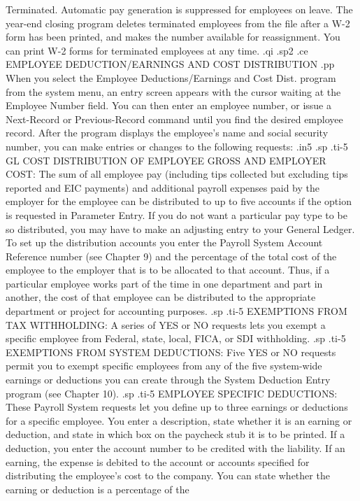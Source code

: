 Terminated. Automatic pay generation is suppressed for employees on
leave.
The year-end closing program deletes
terminated employees from the file after a W-2 form has been printed, and
makes the number available for reassignment. You can print W-2 forms for
terminated employees at any time.
.qi
.sp2
.ce
EMPLOYEE DEDUCTION/EARNINGS AND COST DISTRIBUTION
.pp
When you select the Employee Deductions/Earnings and Cost Dist.
program from the system
menu, an entry screen appears with the cursor
waiting at the Employee Number field.  You can then enter an employee
number, or issue a Next-Record or Previous-Record command until
you find the desired employee record.  After the program displays the
employee's name and social
security number, you can make entries or changes to the
following requests:
.in5
.sp
.ti-5
GL COST DISTRIBUTION OF EMPLOYEE GROSS AND EMPLOYER COST: The sum of
all employee pay (including tips collected but excluding tips reported
and EIC payments)
and additional payroll expenses paid by the employer for
the employee can be distributed to up to five accounts if
the option is requested in Parameter Entry.  If you do not want a
particular pay type to be so distributed, you may have to make an
adjusting entry to your General Ledger. To set up the distribution accounts
you enter the Payroll System Account Reference
number (see Chapter 9) and the
percentage of the total cost of the employee to the employer that is
to be allocated to that account.  Thus, if a particular employee works
part of the time in one department and part in another, the cost
of that employee can be distributed to the appropriate department
or project for accounting purposes.
.sp
.ti-5
EXEMPTIONS FROM TAX WITHHOLDING:  A series of YES or NO requests
lets you exempt a specific employee from Federal, state,
local, FICA, or SDI withholding.
.sp
.ti-5
EXEMPTIONS FROM SYSTEM DEDUCTIONS:  Five YES or NO requests
permit you to exempt specific employees from any of the
five system-wide earnings or
deductions you can create through the
System Deduction Entry program (see Chapter 10).
.sp
.ti-5
EMPLOYEE SPECIFIC DEDUCTIONS:  These Payroll System requests let
you define up to three earnings or deductions for
a specific employee.  You enter a description, state whether it is
an earning or deduction, and state in which box on the paycheck stub it
is to be printed.  If a deduction, you enter the account number to be
credited with the liability. If an earning, the expense is debited
to the account or accounts specified for distributing the employee's
cost to the company.
You can state whether the earning or deduction is a percentage of the

